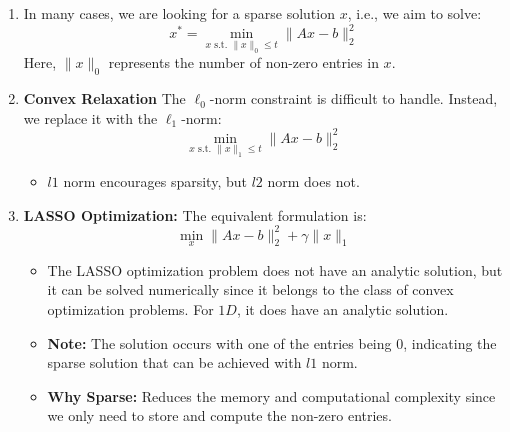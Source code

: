\begin{derivation}
    \begin{enumerate}
        \item In many cases, we are looking for a sparse solution $x$, i.e., we aim to solve:
        \[
        x^* = \min_{x \text{ s.t. } \|x\|_0 \leq t} \|Ax - b\|_2^2 
        \]
        Here, $\|x\|_0$ represents the number of non-zero entries in $x$.
           
        \item \textbf{Convex Relaxation} The $\ell_0$-norm constraint is difficult to handle. Instead, we replace it with the $\ell_1$-norm:
        \[
        \min_{x \text{ s.t. } \|x\|_1 \leq t} \|Ax - b\|_2^2 
        \]
        \begin{itemize}
            \item $l1$ norm encourages sparsity, but $l2$ norm does not.
        \end{itemize}

        \item \textbf{LASSO Optimization:} The equivalent formulation is:
        \[
        \min_x \|Ax - b\|_2^2 + \gamma \|x\|_1
        \]
        \begin{itemize}
            \item The LASSO optimization problem does not have an analytic solution, but it can be solved numerically since it belongs to the class of convex optimization problems. For $1D$, it does have an analytic solution.
        \end{itemize}
        \begin{itemize}
            \item \textbf{Note:} The solution occurs with one of the entries being 0, indicating the sparse solution that can be achieved with $l1$ norm.
            \item \textbf{Why Sparse:} Reduces the memory and computational complexity since we only need to store and compute the non-zero entries.
        \end{itemize}
    \end{enumerate}
\end{derivation}

